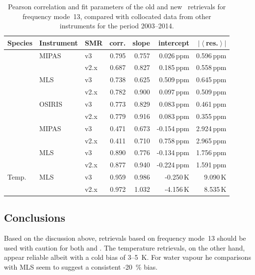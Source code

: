 \begin{table}[tbhp]
\centering
\caption{Pearson correlation and fit parameters of the old and new \smr\
retrievals for frequency mode~13, compared with collocated data from other
instruments for the period 2003--2014.
}
\label{tab:fm13:stats}
\begin{tabular}{lllrrrr}
    \toprule
    \textbf{Species} & \textbf{Instrument} & \textbf{SMR} & \textbf{corr.} & \textbf{slope} & \textbf{intercept} & \textbf{$\left|\left<\right.\right.$res.$\left.\left.\right>\right|$} \\
    \midrule
    \chem{O3}   & MIPAS     & v3    & 0.795 & 0.757 & 0.026\,ppm    & 0.596\,ppm \\
                &           & v2.x  & 0.687 & 0.827 & 0.185\,ppm    & 0.558\,ppm \\
    \cline{2-7}
                & MLS       & v3    & 0.738 & 0.625 & 0.509\,ppm    & 0.645\,ppm \\
                &           & v2.x  & 0.782 & 0.900 & 0.097\,ppm    & 0.509\,ppm \\
    \cline{2-7}
                & OSIRIS    & v3    & 0.773 & 0.829 & 0.083\,ppm    & 0.461\,ppm \\
                &           & v2.x  & 0.779 & 0.916 & 0.083\,ppm    & 0.355\,ppm \\
    \midrule
    \chem{H_2O} & MIPAS     & v3    & 0.471 & 0.673 & -0.154\,ppm   & 2.924\,ppm \\
                &           & v2.x  & 0.411 & 0.710 & 0.758\,ppm    & 2.965\,ppm \\
    \cline{2-7}
                & MLS       & v3    & 0.890 & 0.776 & -0.134\,ppm   & 1.756\,ppm \\
                &           & v2.x  & 0.877 & 0.940 & -0.224\,ppm   & 1.591\,ppm \\
    \midrule
    Temp.       & MLS       & v3    & 0.959 & 0.986 & -0.250\,K     &  9.090\,K \\
                &           & v2.x  & 0.972 & 1.032 & -4.156\,K     &  8.535\,K \\
    \bottomrule
\end{tabular}
\end{table}

\subsection{Conclusions}
\label{sec:fm13:conclusions}
Based on the discussion above, retrievals based on frequency mode~13 should be
used with caution for both \chem{O_3} and \chem{H_2O}. The temperature
retrievals, on the other hand, appear reliable albeit with a cold bias of
3--5~K. For water vapour he comparisons with MLS seem to suggest a consistent
-20~\% bias.
